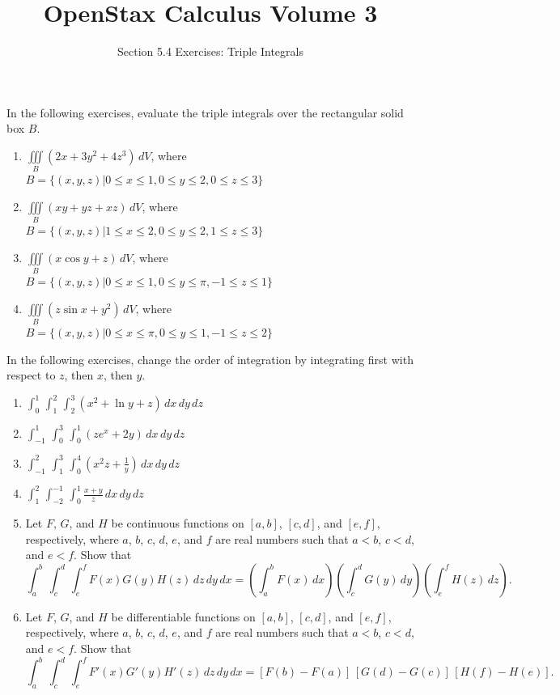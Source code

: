 \documentclass{exercises}
\title{OpenStax Calculus Volume 3}
\subtitle{Section 5.4 Exercises: Triple Integrals}
\author{}
\date{}
\begin{document}
\maketitle


In the following exercises, evaluate the triple integrals over the rectangular solid box $B$.

\begin{enumerate}[start=1]
\item $\underset{B}{\iiint}(2x+3y^{2}+4z^{3})\,dV$, where $B=\{(x,y,z)|0\le x\le1,0\le y\le2,0\le z\le3\}$
\item $\underset{B}{\iiint}(xy+yz+xz)\,dV$, where $B=\{(x,y,z)|1\le x\le2,0\le y\le2,1\le z\le3\}$
\item $\underset{B}{\iiint}(x\cos y+z)\,dV$, where $B=\{(x,y,z)|0\le x\le1,0\le y\le \pi,-1\le z\le1\}$
\item $\underset{B}{\iiint}(z\sin x+y^{2})\,dV$, where $B=\{(x,y,z)|0\le x\le \pi,0\le y\le1,-1\le z\le2\}$
\end{enumerate}

In the following exercises, change the order of integration by integrating first with respect to $z$, then $x$, then $y$.

\begin{enumerate}[resume]
\item $\int_{0}^{1}\,\int_{1}^{2}\,\int_{2}^{3}(x^{2}+\ln y+z)\,dx\,dy\,dz$
\item $\int_{-1}^{1}\,\int_{0}^{3}\,\int_{0}^{1}(ze^{x}+2y)\,dx\,dy\,dz$
\item $\int_{-1}^{2}\,\int_{1}^{3}\,\int_{0}^{4}(x^{2}z+\frac{1}{y})\,dx\,dy\,dz$
\item $\int_{1}^{2}\,\int_{-2}^{-1}\,\int_{0}^{1}\frac{x+y}{z}\,dx\,dy\,dz$
\item Let $F$, $G$, and $H$ be continuous functions on $[a,b]$, $[c,d]$, and $[e,f]$, respectively, where $a$, $b$, $c$, $d$, $e$, and $f$ are real numbers such that $a<b$, $c<d$, and $e<f$. Show that \[\int_{a}^{b}\,\int_{c}^{d}\,\int_{e}^{f}F(x)G(y)H(z)\,dz\,dy\,dx=(\int_{a}^{b}F(x)\,dx)(\int_{c}^{d}G(y)\,dy)(\int_{e}^{f}H(z)\,dz).\]
\item Let $F$, $G$, and $H$ be differentiable functions on $[a,b]$, $[c,d]$, and $[e,f]$, respectively, where $a$, $b$, $c$, $d$, $e$, and $f$ are real numbers such that $a<b$, $c<d$, and $e<f$. Show that \[\int_{a}^{b}\,\int_{c}^{d}\,\int_{e}^{f}F'(x)G'(y)H'(z)\,dz\,dy\,dx=[F(b)-F(a)]\,[G(d)-G(c)]\,[H(f)-H(e)].\]
\end{enumerate}
\end{document}
